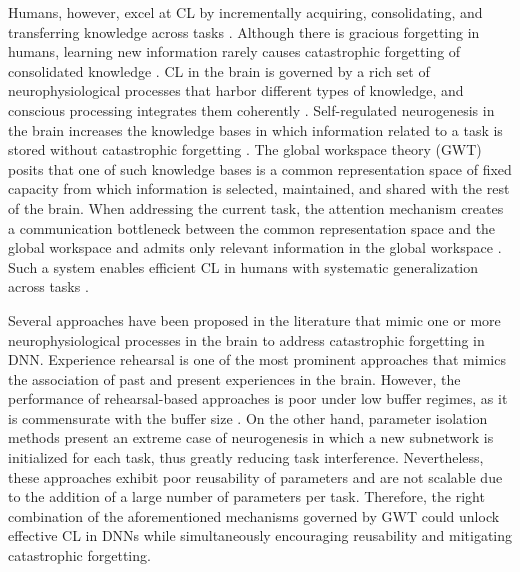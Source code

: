 \documentclass{article} %
\begin{document}
Humans, however, excel at CL by incrementally acquiring, consolidating, and transferring knowledge across tasks \citep{bremner2012multisensory}. Although there is gracious forgetting in humans, learning new information rarely causes catastrophic forgetting of consolidated knowledge \citep{french1999catastrophic}. CL in the brain is governed by a rich set of neurophysiological processes that harbor different types of knowledge, and conscious processing integrates them coherently \citep{goyal2020inductive}. Self-regulated neurogenesis in the brain increases the knowledge bases in which information related to a task is stored without catastrophic forgetting \citep{kudithipudi2022biological}. The global workspace theory (GWT) \citep{baars1994global, baars2005global, baars2021global} posits that one of such knowledge bases is a common representation space of fixed capacity from which information is selected, maintained, and shared with the rest of the brain. When addressing the current task, the attention mechanism creates a communication bottleneck between the common representation space and the global workspace and admits only relevant information in the global workspace \citep{goyal2020inductive}. Such a system enables efficient CL in humans with systematic generalization across tasks \citep{bengio2017consciousness}. 

Several approaches have been proposed in the literature that mimic one or more neurophysiological processes in the brain to address catastrophic forgetting in DNN. Experience rehearsal \citep{ratcliff1990connectionist} is one of the most prominent approaches that mimics the association of past and present experiences in the brain. However, the performance of rehearsal-based approaches is poor under low buffer regimes, as it is commensurate with the buffer size \citep{bhat2022consistency}. On the other hand, parameter isolation methods \citep{rusu2016progressive} present an extreme case of neurogenesis in which a new subnetwork is initialized for each task, thus greatly reducing task interference. Nevertheless, these approaches exhibit poor reusability of parameters and are not scalable due to the addition of a large number of parameters per task. Therefore, the right combination of the aforementioned mechanisms governed by GWT could unlock effective CL in DNNs while simultaneously encouraging reusability and mitigating catastrophic forgetting.  
\end{document}
